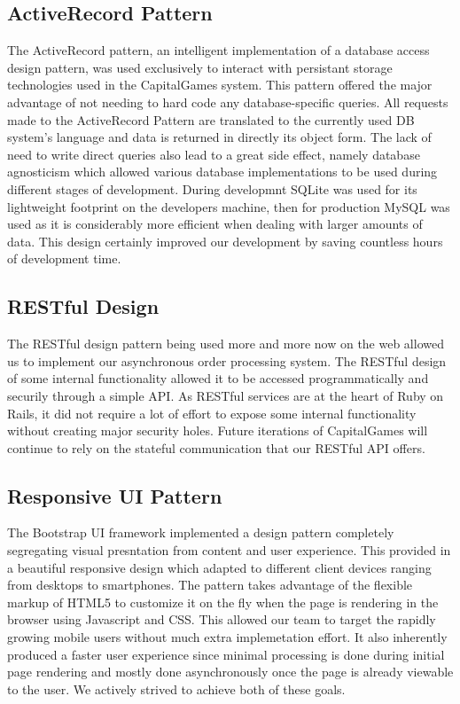 \subsection{ActiveRecord Pattern}
The ActiveRecord pattern, an intelligent implementation of a database access design pattern, was used exclusively to interact with persistant storage technologies used in the CapitalGames system. This pattern offered the major advantage of not needing to hard code any database-specific queries. All requests made to the ActiveRecord Pattern are translated to the currently used DB system's language and data is returned in directly its object form. The lack of need to write direct queries also lead to a great side effect, namely database agnosticism which allowed various database implementations to be used during different stages of development. During developmnt SQLite was used for its lightweight footprint on the developers machine, then for production MySQL was used as it is considerably more efficient when dealing with larger amounts of data. This design certainly improved our development by saving countless hours of development time.
\subsection{RESTful Design}
The RESTful design pattern being used more and more now on the web allowed us to implement our asynchronous order processing system. The RESTful design of some internal functionality allowed it to be accessed programmatically and securily through a simple API. As RESTful services are at the heart of Ruby on Rails, it did not require a lot of effort to expose some internal functionality without creating major security holes. Future iterations of CapitalGames will continue to rely on the stateful communication that our RESTful API offers.
\subsection{Responsive UI Pattern}
The Bootstrap UI framework implemented a design pattern completely segregating visual presntation from content and user experience. This provided in a beautiful responsive design which adapted to different client devices ranging from desktops to smartphones. The pattern takes advantage of the flexible markup of HTML5 to customize it on the fly when the page is rendering in the browser using Javascript and CSS. This allowed our team to target the rapidly growing mobile users without much extra implemetation effort. It also inherently produced a faster user experience since minimal processing is done during initial page rendering and mostly done asynchronously once the page is already viewable to the user. We actively strived to achieve both of these goals.
\fi
